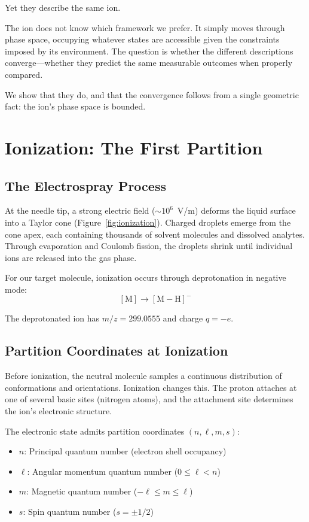 \documentclass[12pt,a4paper]{article}
\theoremstyle{remark}
\begin{document}
Yet they describe the same ion.

The ion does not know which framework we prefer. It simply moves through phase space, occupying whatever states are accessible given the constraints imposed by its environment. The question is whether the different descriptions converge---whether they predict the same measurable outcomes when properly compared.

We show that they do, and that the convergence follows from a single geometric fact: the ion's phase space is bounded.


\section{Ionization: The First Partition}
\label{sec:ionization}

\subsection{The Electrospray Process}

At the needle tip, a strong electric field ($\sim 10^6$~V/m) deforms the liquid surface into a Taylor cone (Figure~\ref{fig:ionization}). Charged droplets emerge from the cone apex, each containing thousands of solvent molecules and dissolved analytes. Through evaporation and Coulomb fission, the droplets shrink until individual ions are released into the gas phase.

For our target molecule, ionization occurs through deprotonation in negative mode:
\begin{equation}
\mathrm{[M]} \to \mathrm{[M - H]}^{-}
\end{equation}

The deprotonated ion has $m/z = 299.0555$ and charge $q = -e$.

\subsection{Partition Coordinates at Ionization}

Before ionization, the neutral molecule samples a continuous distribution of conformations and orientations. Ionization changes this. The proton attaches at one of several basic sites (nitrogen atoms), and the attachment site determines the ion's electronic structure.

The electronic state admits partition coordinates $(n, \ell, m, s)$:
\begin{itemize}
    \item $n$: Principal quantum number (electron shell occupancy)
    \item $\ell$: Angular momentum quantum number ($0 \leq \ell < n$)
    \item $m$: Magnetic quantum number ($-\ell \leq m \leq \ell$)
    \item $s$: Spin quantum number ($s = \pm 1/2$)
\end{itemize}
\end{document}
